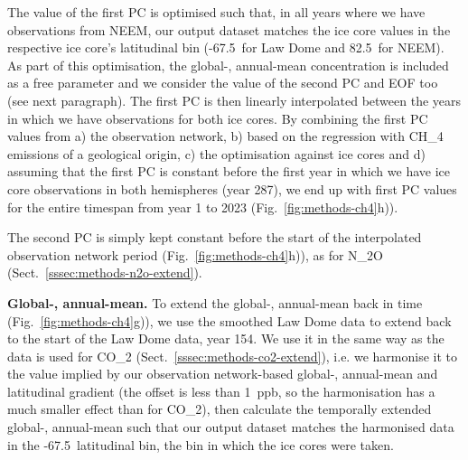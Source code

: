 The value of the first PC is optimised such that,
in all years where we have observations from NEEM,
our output dataset matches the ice core values in the respective ice core's latitudinal bin
(-67.5\textdegree~for Law Dome and 82.5\textdegree~for NEEM).
As part of this optimisation, the global-, annual-mean concentration is included as a free parameter
and we consider the value of the second PC and EOF too (see next paragraph).
The first PC is then linearly interpolated between the years in which we have observations for both ice cores.
By combining the first PC values from a) the observation network,
b) based on the regression with CH_4 emissions of a geological origin,
c) the optimisation against ice cores
and d) assuming that the first PC is constant before the first year in which we have ice core observations in both hemispheres (year 287),
we end up with first PC values for the entire timespan from year 1 to 2023 (Fig.~\ref{fig:methods-ch4}h)).

The second PC is simply kept constant before the start of the interpolated observation network period (Fig.~\ref{fig:methods-ch4}h)),
as for N_2O (Sect.~\ref{sssec:methods-n2o-extend}).

\textbf{Global-, annual-mean.}
To extend the global-, annual-mean back in time (Fig.~\ref{fig:methods-ch4}g)),
we use the smoothed Law Dome data to extend back to the start of the Law Dome data, year 154.
We use it in the same way as the \citet{menking_law-dome_2025} data is used for CO_2 (Sect.~\ref{sssec:methods-co2-extend}),
i.e. we harmonise it to the value implied by our observation network-based global-, annual-mean and latitudinal gradient
(the offset is less than 1~ppb, so the harmonisation has a much smaller effect than for CO_2),
then calculate the temporally extended global-, annual-mean such that our output dataset matches the harmonised data
in the -67.5\textdegree~latitudinal bin, the bin in which the ice cores were taken.

